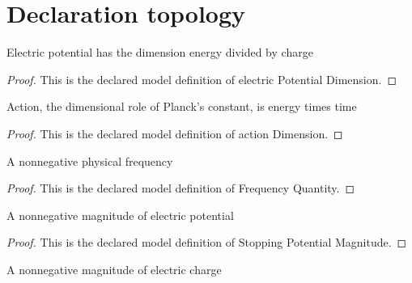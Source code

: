 \section{Declaration topology}
\begin{definition}
  \label{def:physics:phyx-mini-0549:phyxminiproblems-problemphyxmini0549-electricpotentialdimension}
  Electric potential has the dimension energy divided by charge
\end{definition}
\begin{proof}
  This is the declared model definition of electric Potential Dimension.
\end{proof}
\begin{definition}
  \label{def:physics:phyx-mini-0549:phyxminiproblems-problemphyxmini0549-actiondimension}
  Action, the dimensional role of Planck's constant, is energy times time
\end{definition}
\begin{proof}
  This is the declared model definition of action Dimension.
\end{proof}
\begin{definition}
  \label{def:physics:phyx-mini-0549:phyxminiproblems-problemphyxmini0549-frequencyquantity}
  A nonnegative physical frequency
\end{definition}
\begin{proof}
  This is the declared model definition of Frequency Quantity.
\end{proof}
\begin{definition}
  \label{def:physics:phyx-mini-0549:phyxminiproblems-problemphyxmini0549-stoppingpotentialmagnitude}
  A nonnegative magnitude of electric potential
\end{definition}
\begin{proof}
  This is the declared model definition of Stopping Potential Magnitude.
\end{proof}
\begin{definition}
  \label{def:physics:phyx-mini-0549:phyxminiproblems-problemphyxmini0549-chargemagnitudequantity}
  A nonnegative magnitude of electric charge
\end{definition}
